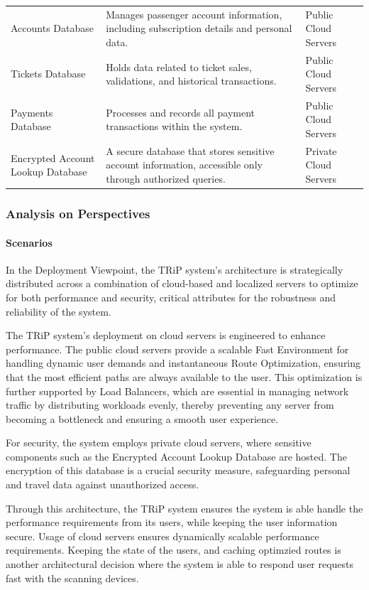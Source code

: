 \begin{table}[H]
\begin{tabularx}{\textwidth}{@{}lXX@{}}
    Accounts Database & Manages passenger account information, including subscription details and personal data. & Public Cloud Servers \\
    Tickets Database & Holds data related to ticket sales, validations, and historical transactions. & Public Cloud Servers \\
    Payments Database & Processes and records all payment transactions within the system. & Public Cloud Servers \\
    Encrypted Account Lookup Database & A secure database that stores sensitive account information, accessible only through authorized queries. & Private Cloud Servers \\
    \bottomrule
    \end{tabularx}
\end{table}
\subsubsection{Analysis on Perspectives}

\paragraph{Scenarios}


In the Deployment Viewpoint, the TRiP system's architecture is strategically distributed across a combination of cloud-based and localized servers to optimize for both performance and security, critical attributes for the robustness and reliability of the system.

The TRiP system's deployment on cloud servers is engineered to enhance performance. The public cloud servers provide a scalable Fast Environment for handling dynamic user demands and instantaneous Route Optimization, ensuring that the most efficient paths are always available to the user. This optimization is further supported by Load Balancers, which are essential in managing network traffic by distributing workloads evenly, thereby preventing any server from becoming a bottleneck and ensuring a smooth user experience. 

For security, the system employs private cloud servers, where sensitive components such as the Encrypted Account Lookup Database are hosted. The encryption of this database is a crucial security measure, safeguarding personal and travel data against unauthorized access. 

Through this architecture, the TRiP system ensures the system is able handle the performance requirements from its users, while keeping the user information secure. Usage of cloud servers ensures dynamically scalable performance requirements. Keeping the state of the users, and caching optimzied routes is another architectural decision where the system is able to respond user requests fast with the scanning devices.
